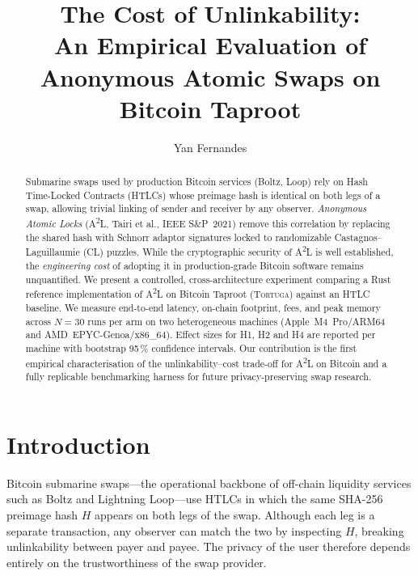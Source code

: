 \documentclass[sigconf,nonacm]{acmart}
\title{The Cost of Unlinkability:\\
An Empirical Evaluation of \atwol Anonymous Atomic Swaps on Bitcoin Taproot}
\author{Yan Fernandes}
\affiliation{%
  \institution{UCSal}
  \city{Salvador}
  \country{Brazil}
}
\newcommand{\toolname}{\textsc{Tortuga}\xspace}
\newcommand{\atwol}{A\textsuperscript{2}L\xspace}
\begin{document}
\begin{abstract}
	Submarine swaps used by production Bitcoin services (Boltz, Loop) rely on
	Hash Time-Locked Contracts (HTLCs) whose preimage hash is identical on both
	legs of a swap, allowing trivial linking of sender and receiver by any
	observer. \emph{Anonymous Atomic Locks} (\atwol, Tairi et al., IEEE S\&P~2021)
	remove this correlation by replacing the shared hash with Schnorr adaptor
	signatures locked to randomizable Castagnos--Laguillaumie (CL) puzzles. While
	the cryptographic security of \atwol is well established, the
	\emph{engineering cost} of adopting it in production-grade Bitcoin software
	remains unquantified. We present a controlled, cross-architecture experiment
	comparing a Rust reference implementation of \atwol on Bitcoin Taproot
	(\toolname) against an HTLC baseline. We measure end-to-end latency,
	on-chain footprint, fees, and peak memory across $N=\num{30}$ runs per arm on
	two heterogeneous machines (Apple~M4~Pro/ARM64 and AMD~EPYC-Genoa/x86\_64).
	Effect sizes for H1, H2 and H4 are reported per machine with bootstrap
	95\,\% confidence intervals.
	Our contribution is the first empirical characterisation of the
	unlinkability--cost trade-off for \atwol on Bitcoin and a fully replicable
	benchmarking harness for future privacy-preserving swap research.
\end{abstract}


\maketitle

\section{Introduction}
\label{sec:intro}

Bitcoin submarine swaps---the operational backbone of off-chain liquidity
services such as Boltz and Lightning Loop---use HTLCs in which the same
SHA-256 preimage hash $H$ appears on both legs of the swap. Although each
leg is a separate transaction, any observer can match the two by inspecting
$H$, breaking unlinkability between payer and payee. The privacy of the user
therefore depends entirely on the trustworthiness of the swap provider.
\end{document}
